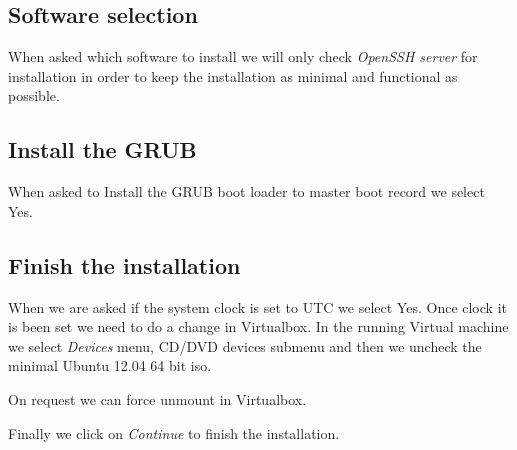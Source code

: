 \subsection {Software selection}
When asked which software to install we will only check \textit{OpenSSH server} for installation in order to keep the installation as minimal and functional as possible.

\subsection {Install the GRUB}
When asked to Install the GRUB boot loader to master boot record we select Yes.

\subsection {Finish the installation}
When we are asked if the system clock is set to UTC we select Yes. Once clock it is been set we need to do a change in Virtualbox. In the running Virtual machine we select \textit{Devices} menu, CD/DVD devices submenu and then we uncheck the minimal Ubuntu 12.04 64 bit iso.

On request we can force unmount in Virtualbox.

Finally we click on \textit{Continue} to finish the installation.
